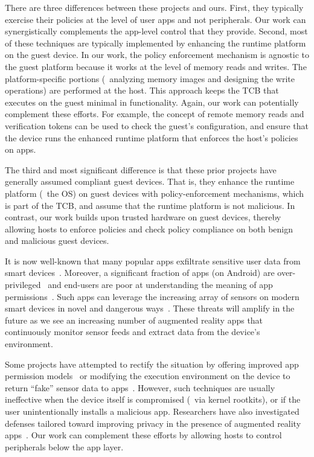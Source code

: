 There are three differences between these projects and ours. First, they
typically exercise their policies at the level of user apps and not
peripherals. Our work can synergistically complements the app-level control
that they provide.  Second, most of these techniques are typically implemented
by enhancing the runtime platform on the guest device. In our work, the policy
enforcement mechanism is agnostic to the guest platform because it works at the
level of memory reads and writes. The platform-specific portions (\ie~analyzing
memory images and designing the write operations) are performed at the host.
This approach keeps the TCB that executes on the guest minimal in
functionality. Again, our work can potentially complement these efforts. For
example, the concept of remote memory reads and verification tokens can be used
to check the guest's configuration, and ensure that the device runs the
enhanced runtime platform that enforces the host's policies on apps.

The third and most significant difference is that these prior projects have
generally assumed compliant guest devices. That is, they enhance the runtime
platform (\eg~the OS) on guest devices with policy-enforcement mechanisms,
which is part of the TCB, and assume that the runtime platform is not
malicious. In contrast, our work builds upon trusted hardware on guest devices,
thereby allowing hosts to enforce policies and check policy compliance on both
benign and malicious guest devices.

%
It is now well-known that many popular apps exfiltrate sensitive user data from
smart devices~\cite{taintdroid:osdi10}. Moreover, a significant fraction of
apps (on Android) are over-privileged~\cite{stowaway:ccs11,pscout:ccs12} and
end-users are poor at understanding the meaning of app
permissions~\cite{ep:ubicomp12,felt:soups12}.  Such apps can leverage the
increasing array of sensors on modern smart devices in novel and dangerous
ways~\cite{soundcomber:ndss11,placeraider:ndss13}. These threats will amplify
in the future as we see an increasing number of augmented reality apps that
continuously monitor sensor feeds and extract data from the device's
environment.

Some projects have attempted to rectify the situation by offering improved app
permission models~\cite{howtoask:hotsec12} or modifying the execution
environment on the device to return ``fake'' sensor data to
apps~\cite{mockdroid:hotmobile10}. However, such techniques are usually
ineffective when the device itself is compromised (\eg~via kernel rootkits), or
if the user unintentionally installs a malicious app. Researchers have also
investigated defenses tailored toward improving privacy in the presence of
augmented reality apps~\cite{ar:sec13,darkly:oak13}. Our work can complement
these efforts by allowing hosts to control peripherals below the app layer. 

